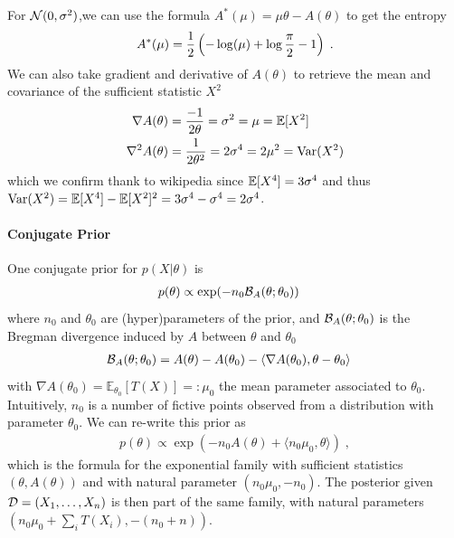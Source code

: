 \documentclass{article}
\newcommand*{\expect}[2][]{\ensuremath{\mathbb{E}_{#1} \left[ #2 \right] }} %
\newcommand{\logpart}{A}
\newcommand{\conj}{\logpart^*}
\newcommand{\bregman}{\cB_\logpart}
\newcommand{\natp}{\theta}
\newcommand{\meanp}{\mu}
\begin{document}
\begin{example}
For ${\mathcal N}(0,\sigma^2)$,we can use the formula $\conj(\mu) = \mu \natp - \logpart(\natp)$ to get the entropy
\begin{align}
	\conj(\mu) = \half\left( -\log(\mu) + \log\frac{\pi}{2} - 1 \right) \; .
\end{align}
We can also take gradient and derivative of $\logpart(\natp)$ to retrieve the mean and covariance of the sufficient statistic $X^2$
\begin{align}
	\nabla\logpart(\natp) &= \frac{-1}{2 \natp} = \sigma^2 = \mu = \E[X^2] \\
	\nabla^2\logpart(\natp) &= \frac{1}{2 \natp^2} = 2 \sigma^4 = 2 \mu^2 = \Var(X^2) 
\end{align}
which we confirm thank to wikipedia since $\operatorname{\mathbb{E}}[X^4] = 3 \sigma^4$ and thus $\operatorname{\mathrm{Var}}(X^2) = \operatorname{\mathbb{E}}[X^4] - \operatorname{\mathbb{E}}[X^2]^2 = 3 \sigma^4 - \sigma^4 = 2 \sigma^4$.
\end{example}

\paragraph{Conjugate Prior}
One conjugate prior for $p(X|\natp)$ is
\begin{align}
    p(\natp) &\propto \exp( - n_0 \bregman(\natp ; \natp_0) )
\end{align}
where $n_0$ and $\natp_0$ are (hyper)parameters of the prior, and $\bregman(\natp ; \natp_0)$ is the Bregman divergence induced by $\logpart$ between $\natp$ and $\natp_0$
\begin{align}
    \bregman (\natp ; \natp_0)
    & = \logpart(\natp) - \logpart(\natp_0) 
    - \langle \nabla \logpart(\natp_0)  , \natp - \natp_0 \rangle
\end{align}
with $\nabla \logpart(\natp_0) = \expect[\natp_0]{T(X)} =: \meanp_0$ the mean parameter associated to $\natp_0$. 
Intuitively, $n_0$ is a number of fictive points observed from a distribution with parameter $\natp_0$.
We can re-write this prior as 
\begin{align}
    p(\natp) \propto 
    \exp( -n_0 \logpart (\natp) 
    + \langle n_0 \mu_0, \natp \rangle ) \; ,
\end{align}
which is the formula for the exponential family with sufficient statistics $(\natp ,\logpart(\natp))$ and with natural parameter $(n_0 \mu_0, -n_0)$.
The posterior given ${\mathcal D}=(X_1,\dots, X_n)$ is then part of the same family, with natural parameters $(n_0 \mu_0 + \sum_i T(X_i) , -(n_0 + n))$.
\end{document}
